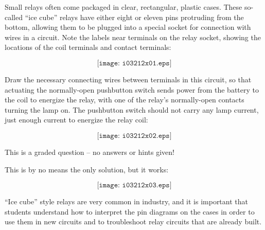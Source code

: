 

Small relays often come packaged in clear, rectangular, plastic cases.  These so-called ``ice cube'' relays have either eight or eleven pins protruding from the bottom, allowing them to be plugged into a special socket for connection with wires in a circuit.  Note the labels near terminals on the relay socket, showing the locations of the coil terminals and contact terminals:

$$\texttt{[image: i03212x01.eps]}$$

Draw the necessary connecting wires between terminals in this circuit, so that actuating the normally-open pushbutton switch sends power from the battery to the coil to energize the relay, with one of the relay's normally-open contacts turning the lamp on.  The pushbutton switch should not carry any lamp current, just enough current to energize the relay coil:

\vskip 20pt

$$\texttt{[image: i03212x02.eps]}$$

\vfil 

\eject






This is a graded question -- no answers or hints given!
 






This is by no means the only solution, but it works:

$$\texttt{[image: i03212x03.eps]}$$

``Ice cube'' style relays are very common in industry, and it is important that students understand how to interpret the pin diagrams on the cases in order to use them in new circuits and to troubleshoot relay circuits that are already built.





